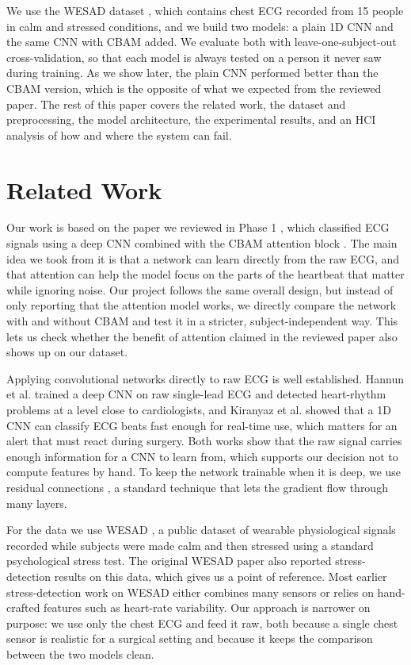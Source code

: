 \documentclass[conference]{IEEEtran}
\begin{document}
We use the WESAD dataset \cite{wesad}, which contains chest ECG recorded from 15
people in calm and stressed conditions, and we build two models: a plain 1D CNN
and the same CNN with CBAM added. We evaluate both with leave-one-subject-out
cross-validation, so that each model is always tested on a person it never saw
during training. As we show later, the plain CNN performed better than the CBAM
version, which is the opposite of what we expected from the reviewed paper. The
rest of this paper covers the related work, the dataset and preprocessing, the
model architecture, the experimental results, and an HCI analysis of how and
where the system can fail.

\section{Related Work}
Our work is based on the paper we reviewed in Phase 1 \cite{reviewed}, which
classified ECG signals using a deep CNN combined with the CBAM attention block
\cite{cbam}. The main idea we took from it is that a network can learn directly
from the raw ECG, and that attention can help the model focus on the parts of
the heartbeat that matter while ignoring noise. Our project follows the same
overall design, but instead of only reporting that the attention model works, we
directly compare the network with and without CBAM and test it in a stricter,
subject-independent way. This lets us check whether the benefit of attention
claimed in the reviewed paper also shows up on our dataset.

Applying convolutional networks directly to raw ECG is well established. Hannun
et al. \cite{hannun} trained a deep CNN on raw single-lead ECG and detected
heart-rhythm problems at a level close to cardiologists, and Kiranyaz et al.
\cite{kiranyaz} showed that a 1D CNN can classify ECG beats fast enough for
real-time use, which matters for an alert that must react during surgery. Both
works show that the raw signal carries enough information for a CNN to learn
from, which supports our decision not to compute features by hand. To keep the
network trainable when it is deep, we use residual connections \cite{resnet}, a
standard technique that lets the gradient flow through many layers.

For the data we use WESAD \cite{wesad}, a public dataset of wearable
physiological signals recorded while subjects were made calm and then stressed
using a standard psychological stress test. The original WESAD paper also
reported stress-detection results on this data, which gives us a point of
reference. Most earlier stress-detection work on WESAD either combines many
sensors or relies on hand-crafted features such as heart-rate variability. Our
approach is narrower on purpose: we use only the chest ECG and feed it raw, both
because a single chest sensor is realistic for a surgical setting and because it
keeps the comparison between the two models clean.
\end{document}
